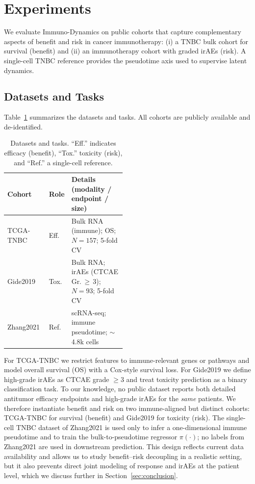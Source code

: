 \documentclass{article}
\begin{document}
\section{Experiments}
\label{sec:exp}

We evaluate Immuno-Dynamics on public cohorts that capture complementary aspects of benefit and risk in cancer immunotherapy: (i) a TNBC bulk cohort for survival (benefit) and (ii) an immunotherapy cohort with graded irAEs (risk). A single-cell TNBC reference provides the pseudotime axis used to supervise latent dynamics.

\subsection{Datasets and Tasks}

Table~\ref{tab:datasets} summarizes the datasets and tasks.
All cohorts are publicly available and de-identified.

\begin{table}[t]
\small
\centering
\setlength{\tabcolsep}{3pt}
\caption{Datasets and tasks. ``Eff.'' indicates efficacy (benefit), ``Tox.'' toxicity (risk), and ``Ref.'' a single-cell reference.}
\label{tab:datasets}
\begin{tabularx}{\linewidth}{p{0.35\linewidth} p{0.13\linewidth} X}
\toprule
\textbf{Cohort} & \textbf{Role} & \textbf{Details (modality / endpoint / size)} \\
\midrule
TCGA-TNBC &
Eff. &
Bulk RNA (immune); OS; $N{=}157$; 5-fold CV \\
Gide2019 \cite{gide2019distinct} &
Tox. &
Bulk RNA; irAEs (CTCAE Gr.\,$\ge$\,3); $N{=}93$; 5-fold CV \\
Zhang2021 \cite{zhang2021single} &
Ref. &
scRNA-seq; immune pseudotime; $\sim$4.8k cells \\
\bottomrule
\end{tabularx}
\end{table}

For TCGA-TNBC we restrict features to immune-relevant genes or pathways and model overall survival (OS) with a Cox-style survival loss. For Gide2019 we define high-grade irAEs as CTCAE grade $\ge 3$ and treat toxicity prediction as a binary classification task. To our knowledge, no public dataset reports both detailed antitumor efficacy endpoints and high-grade irAEs for the \emph{same} patients. We therefore instantiate benefit and risk on two immune-aligned but distinct cohorts: TCGA-TNBC for survival (benefit) and Gide2019 for toxicity (risk). The single-cell TNBC dataset of Zhang2021 is used only to infer a one-dimensional immune pseudotime and to train the bulk-to-pseudotime regressor $\pi(\cdot)$; no labels from Zhang2021 are used in downstream prediction. This design reflects current data availability and allows us to study benefit--risk decoupling in a realistic setting, but it also prevents direct joint modeling of response and irAEs at the patient level, which we discuss further in Section~\ref{sec:conclusion}.
\end{document}
